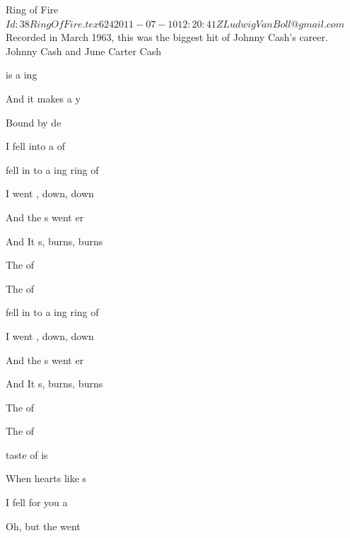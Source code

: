 \begin{SBSong}{Ring of Fire}
  {$Id: 38RingOfFire.tex 624 2011-07-10 12:20:41Z LudwigVanBoll@gmail.com $}
  {Recorded in March 1963, this was the biggest hit of Johnny Cash's career.}
  {Johnny Cash and June Carter Cash}
  \begin{SBVerse}
     is a ing 
    
    And it makes a y 
    
    Bound by  de
    
    I fell into a  of 
  \end{SBVerse}
  \begin{SBChorus}
     fell in to a ing ring of 
    
    I went , down, down
    
    And the s went er
    
    And It s, burns, burns
    
    The  of 
    
    The  of 
   
     fell in to a ing ring of 
    
    I went , down, down
    
    And the s went er
    
    And It s, burns, burns
    
    The  of 
    
    The  of 
  \end{SBChorus}
  \begin{SBVerse}
     taste of  is 
    
    When hearts like s 
    
    I fell for you  a 
    
    Oh, but the  went 
  \end{SBVerse}
\end{SBSong}
